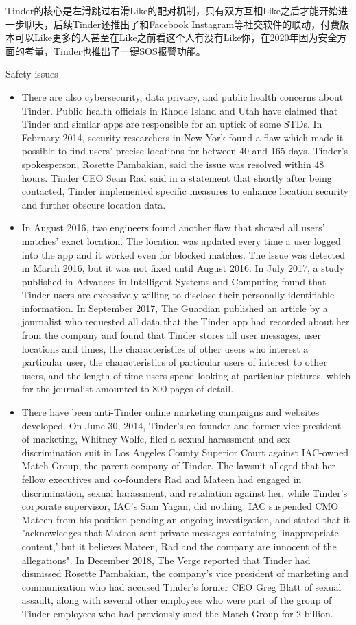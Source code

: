 \documentclass[UTF8]{ctexart}
\begin{document}
Tinder的核心是左滑跳过右滑Like的配对机制，只有双方互相Like之后才能开始进一步聊天，后续Tinder还推出了和Facebook Instagram等社交软件的联动，付费版本可以Like更多的人甚至在Like之前看这个人有没有Like你，在2020年因为安全方面的考量，Tinder也推出了一键SOS报警功能。

\begin{tcolorbox}[breakable]
    Safety issues
    \begin{itemize}
        \item There are also cybersecurity, data privacy, and public health concerns about Tinder. Public health officials in Rhode Island and Utah have claimed that Tinder and similar apps are responsible for an uptick of some STDs. In February 2014, security researchers in New York found a flaw which made it possible to find users' precise locations for between 40 and 165 days. Tinder's spokesperson, Rosette Pambakian, said the issue was resolved within 48 hours. Tinder CEO Sean Rad said in a statement that shortly after being contacted, Tinder implemented specific measures to enhance location security and further obscure location data.
        \item In August 2016, two engineers found another flaw that showed all users' matches' exact location. The location was updated every time a user logged into the app and it worked even for blocked matches. The issue was detected in March 2016, but it was not fixed until August 2016. In July 2017, a study published in Advances in Intelligent Systems and Computing found that Tinder users are excessively willing to disclose their personally identifiable information. In September 2017, The Guardian published an article by a journalist who requested all data that the Tinder app had recorded about her from the company and found that Tinder stores all user messages, user locations and times, the characteristics of other users who interest a particular user, the characteristics of particular users of interest to other users, and the length of time users spend looking at particular pictures, which for the journalist amounted to 800 pages of detail.
        \item There have been anti-Tinder online marketing campaigns and websites developed. On June 30, 2014, Tinder's co-founder and former vice president of marketing, Whitney Wolfe, filed a sexual harassment and sex discrimination suit in Los Angeles County Superior Court against IAC-owned Match Group, the parent company of Tinder. The lawsuit alleged that her fellow executives and co-founders Rad and Mateen had engaged in discrimination, sexual harassment, and retaliation against her, while Tinder's corporate supervisor, IAC's Sam Yagan, did nothing. IAC suspended CMO Mateen from his position pending an ongoing investigation, and stated that it "acknowledges that Mateen sent private messages containing 'inappropriate content,' but it believes Mateen, Rad and the company are innocent of the allegations". In December 2018, The Verge reported that Tinder had dismissed Rosette Pambakian, the company's vice president of marketing and communication who had accused Tinder's former CEO Greg Blatt of sexual assault, along with several other employees who were part of the group of Tinder employees who had previously sued the Match Group for 2 billion.\cite{WikiTinderFeatures}

\end{itemize}
\end{tcolorbox}
\end{document}
